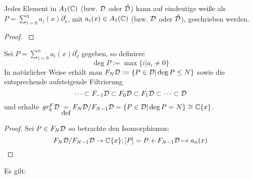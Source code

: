\begin{prop} \label{prop:weyl_eindeutige_schreibung}
  Jedes Element in $A_1({\mathbb C})$ (bzw. ${\mathcal{D}}$ oder $\hat{{\mathcal{D}}}$) kann auf eindeutige
  weiße als $P=\sum_{i=0}^na_i(x)\partial_x^i$, mit $a_i(x)\in A_1({\mathbb C})$ (bzw.
  ${\mathcal{D}}$ oder $\hat{{\mathcal{D}}}$), geschrieben werden. 
\end{prop}
\begin{proof}
  \cite[Proposition 1.2.3]{sabbah_cimpa90}
  \begin{comment}
    ein teil des Beweises ist "left as an exersice"
  \end{comment}
\end{proof}



\begin{defn}
  Sei $P=\sum_{i=0}^na_i(x)\partial_x^i$ gegeben, so definiere 
  \[
    \deg P:=\max\{i|a_i\neq 0\}
  \]
  In natürlicher Weise erhält man $F_N{\mathcal{D}}:=\{P\in{\mathcal{D}}|\deg P\leq N\}$ sowie die
  entsprechende aufsteigende Filtrierung
  \[
    \cdots\subset F_{-1}{\mathcal{D}}\subset F_{0}{\mathcal{D}}\subset F_{1}{\mathcal{D}}\subset\cdots\subset{\mathcal{D}}
  \]
  und erhalte $gr_k^F{\mathcal{D}}\underset{\mbox{def}}{=}F_N{\mathcal{D}}\slash F_{N-1}{\mathcal{D}}
  =\{P\in{\mathcal{D}}|\deg P=N\}\cong{\mathbb C}\{x\}$.
\end{defn}

\begin{proof}
  Sei $P\in F_N{\mathcal{D}}$ so betrachte den Isomorphismus:
  \[
    F_N{\mathcal{D}}\slash F_{N-1}{\mathcal{D}}\rightarrow {\mathbb C}\{x\}; [P]=P+F_{N-1}{\mathcal{D}}\mapsto a_n(x)
  \]
\end{proof}

\begin{prop}
  Es gilt:
  \begin{center}
  \end{center}
\end{prop}

